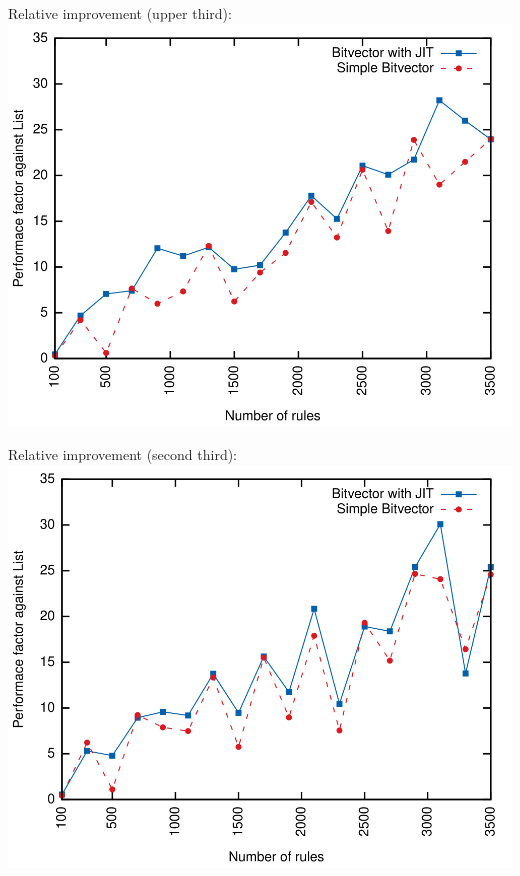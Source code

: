 \documentclass[xcolor=x11names,compress]{beamer}
\renewcommand{\(}{\begin{columns}}
\renewcommand{\)}{\end{columns}}
\newcommand{\<}[1]{\begin{column}{#1}}
\renewcommand{\>}{\end{column}}
\begin{document}
\begin{frame}[noframenumbering]
  Relative improvement (upper third):
  \includegraphics[height=0.9\textheight]{figures/eval_b_relative}
\end{frame}

\begin{frame}[noframenumbering]
  Relative improvement (second third):
  \includegraphics[height=0.9\textheight]{figures/eval_a_relative}
\end{frame}
\end{document}
